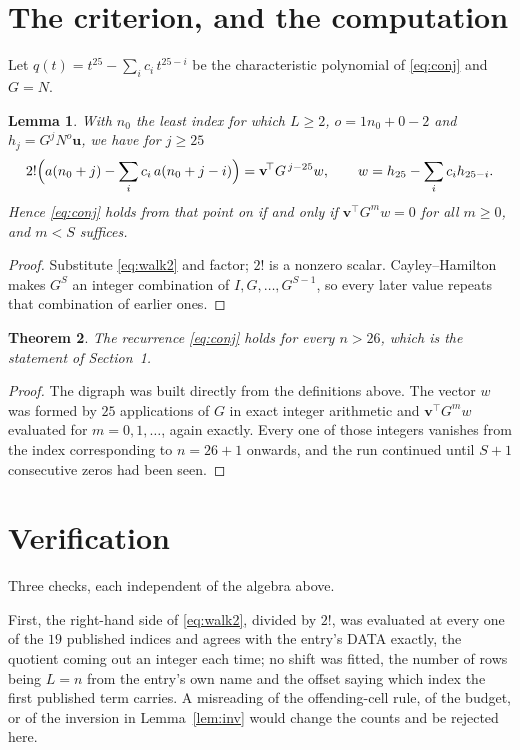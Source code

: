 \documentclass[11pt,a4paper]{article}
\theoremstyle{plain}
\newtheorem{theorem}{Theorem}
\newtheorem{lemma}[theorem]{Lemma}
\theoremstyle{definition}
\begin{document}
\section{The criterion, and the computation}

Let $q(t)=t^{25}-\sum_i c_i\,t^{25-i}$ be the characteristic polynomial of
\eqref{eq:conj} and $G=N$.

\begin{lemma}\label{lem:crit}
With $n_0$ the least index for which $L\ge2$, $o=1n_0+0-2$ and
$h_j=G^{j}N^{o}\mathbf{u}$, we have for $j\ge25$
\[
2!\Bigl(a(n_0+j)-\sum_i c_i\,a(n_0+j-i)\Bigr)=\mathbf{v}^{\!\top}G^{\,j-25}w,
\qquad w=h_{25}-\sum_i c_i h_{25-i} .
\]
Hence \eqref{eq:conj} holds from that point on if and only if
$\mathbf{v}^{\!\top}G^{m}w=0$ for all $m\ge0$, and $m<S$ suffices.
\end{lemma}

\begin{proof}
Substitute \eqref{eq:walk2} and factor; $2!$ is a nonzero scalar. Cayley--Hamilton
makes $G^{S}$ an integer combination of $I,G,\dots,G^{S-1}$, so every later value repeats
that combination of earlier ones.
\end{proof}

\begin{theorem}
The recurrence \eqref{eq:conj} holds for every $n>26$, which is the statement of
Section~1.
\end{theorem}

\begin{proof}
The digraph was built directly from the definitions above. The vector $w$ was formed by
$25$ applications of $G$ in exact integer arithmetic and $\mathbf{v}^{\!\top}G^{m}w$
evaluated for $m=0,1,\dots$, again exactly. Every one of those integers vanishes from the
index corresponding to $n=26+1$ onwards, and the run continued until $S+1$ consecutive
zeros had been seen.
\end{proof}

\section{Verification}

Three checks, each independent of the algebra above.

First, the right-hand side of \eqref{eq:walk2}, divided by $2!$, was evaluated at every
one of the $19$ published indices and agrees with the entry's DATA exactly, the quotient
coming out an integer each time; no shift was fitted, the number of rows being
$L=n$ from the entry's own name and the offset saying which index the first published
term carries. A misreading of the offending-cell rule, of the budget, or of the inversion in
Lemma~\ref{lem:inv} would change the counts and be rejected here.
\end{document}
